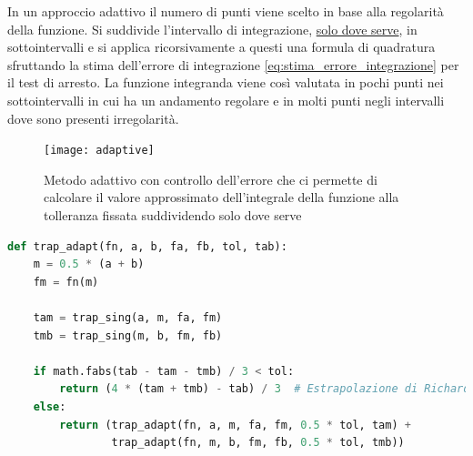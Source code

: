 \documentclass{article}
\begin{document}
In un approccio adattivo il numero di punti viene scelto in base alla
regolarità della funzione. Si suddivide l'intervallo di integrazione,
\underline{solo dove serve}, in sottointervalli e si applica ricorsivamente a
questi una formula di quadratura sfruttando la stima dell'errore di
integrazione \ref{eq:stima_errore_integrazione} per il test di arresto. La
funzione integranda viene così valutata in pochi punti nei sottointervalli in
cui ha un andamento regolare e in molti punti negli intervalli dove sono
presenti irregolarità.

\begin{figure}[ht]
    \centering
    \texttt{[image: adaptive]}
    \caption{Metodo adattivo con controllo dell'errore che ci permette di
    calcolare il valore approssimato dell'integrale della funzione alla
tolleranza fissata suddividendo solo dove serve}
\end{figure}
\begin{lstlisting}[language=Python]
def trap_adapt(fn, a, b, fa, fb, tol, tab):
    m = 0.5 * (a + b)
    fm = fn(m)
    
    tam = trap_sing(a, m, fa, fm)
    tmb = trap_sing(m, b, fm, fb)
    
    if math.fabs(tab - tam - tmb) / 3 < tol:
        return (4 * (tam + tmb) - tab) / 3  # Estrapolazione di Richardson
    else:
        return (trap_adapt(fn, a, m, fa, fm, 0.5 * tol, tam) + 
                trap_adapt(fn, m, b, fm, fb, 0.5 * tol, tmb))
\end{lstlisting}
\end{document}
